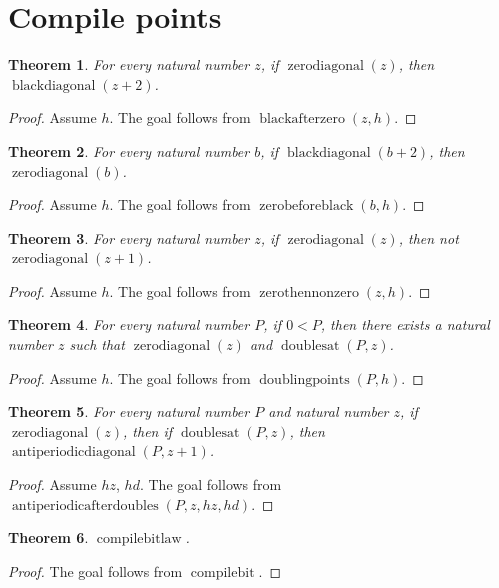 \documentclass[11pt]{article}
\newtheorem{theorem}{Theorem}[section]
\theoremstyle{definition}
\begin{document}
\section{Compile points}
\label{ll:paper:compile-points}
\begin{theorem}
\label{ll:paper:black-after-zero}
For every natural number \(z\), if \(\operatorname{zerodiagonal}(z)\), then \(\operatorname{blackdiagonal}(z + 2)\).
\end{theorem}
\begin{proof}
Assume \(h\).
The goal follows from \(\operatorname{blackafterzero}(z, h)\).
\end{proof}
\begin{theorem}
\label{ll:paper:zero-before-black}
For every natural number \(b\), if \(\operatorname{blackdiagonal}(b + 2)\), then \(\operatorname{zerodiagonal}(b)\).
\end{theorem}
\begin{proof}
Assume \(h\).
The goal follows from \(\operatorname{zerobeforeblack}(b, h)\).
\end{proof}
\begin{theorem}
\label{ll:paper:isolated-zeros}
For every natural number \(z\), if \(\operatorname{zerodiagonal}(z)\), then not \(\operatorname{zerodiagonal}(z + 1)\).
\end{theorem}
\begin{proof}
Assume \(h\).
The goal follows from \(\operatorname{zerothennonzero}(z, h)\).
\end{proof}
\begin{theorem}
\label{ll:paper:doubling-points}
For every natural number \(P\), if \(0 < P\), then there exists a natural number \(z\) such that \(\operatorname{zerodiagonal}(z)\) and \(\operatorname{doublesat}(P, z)\).
\end{theorem}
\begin{proof}
Assume \(h\).
The goal follows from \(\operatorname{doublingpoints}(P, h)\).
\end{proof}
\begin{theorem}
\label{ll:paper:antiperiodic-doubling}
For every natural number \(P\) and natural number \(z\), if \(\operatorname{zerodiagonal}(z)\), then if \(\operatorname{doublesat}(P, z)\), then \(\operatorname{antiperiodicdiagonal}(P, z + 1)\).
\end{theorem}
\begin{proof}
Assume \(hz\), \(hd\).
The goal follows from \(\operatorname{antiperiodicafterdoubles}(P, z, hz, hd)\).
\end{proof}
\begin{theorem}
\label{ll:paper:compile-bit}
\(\operatorname{compilebitlaw}\).
\end{theorem}
\begin{proof}
The goal follows from \(\operatorname{compilebit}\).
\end{proof}
\end{document}
